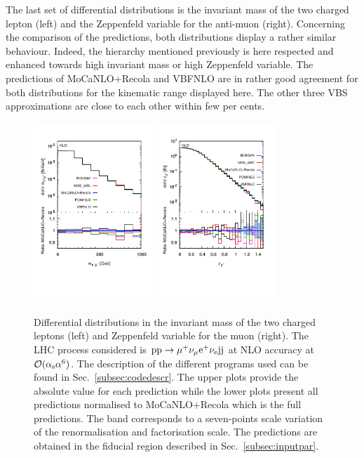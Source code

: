 The last set of differential distributions is the invariant mass of the two charged lepton (left) and the Zeppenfeld variable for the anti-muon (right).
Concerning the comparison of the predictions, both distributions display a rather similar behaviour.
Indeed, the hierarchy mentioned previously is here respected and enhanced towards high invariant mass or high Zeppenfeld variable.
The predictions of {\sc MoCaNLO}+{\sc Recola} and {\sc VBFNLO} are in rather good agreement for both distributions for the kinematic range displayed here.
The other three VBS approximations are close to each other within few per cents.

 \begin{figure}[hbt!]
   \centering
   \includegraphics[width=0.4\textwidth,angle=0,clip=true,trim={0.4cm 2cm 0.cm 1.cm}]{figures/NLO/mll_NLO.pdf}
   \includegraphics[width=0.4\textwidth,angle=0,clip=true,trim={0.4cm 2cm 0.cm 1.cm}]{figures/NLO/zmu_NLO.pdf}
\caption{\label{fig:distNLO3} Differential distributions in the invariant mass of the two charged leptons (left) and Zeppenfeld variable for the muon (right).
The LHC process considered is ${\rm p}{\rm p}\to\mu^+\nu_\mu{\rm e}^+\nu_{\rm e}{\rm j}{\rm j}$ at NLO accuracy at $\mathcal{O}(\alpha_{\rm s}\alpha^6)$.
The description of the different programs used can be found in Sec.~\ref{subsec:codedescr}.
The upper plots provide the absolute value for each prediction while the lower plots present all predictions normalised to {\sc MoCaNLO}+{\sc Recola} which is the full predictions.
The band corresponds to a seven-points scale variation of the renormalisation and factorisation scale.
The predictions are obtained in the fiducial region described in Sec.~\ref{subsec:inputpar}.
}
\end{figure}


